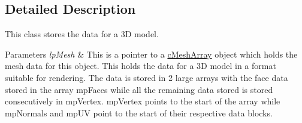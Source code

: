 \subsection{Detailed Description}
This class stores the data for a 3D model. 


\begin{DoxyParams}{Parameters}
{\em lpMesh} & This is a pointer to a \hyperlink{classc_mesh_array}{cMeshArray} object which holds the mesh data for this object. This holds the data for a 3D model in a format suitable for rendering. The data is stored in 2 large arrays with the face data stored in the array mpFaces while all the remaining data stored is stored consecutively in mpVertex. mpVertex points to the start of the array while mpNormals and mpUV point to the start of their respective data blocks. \\
\hline
\end{DoxyParams}

